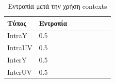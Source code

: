 \begin{table}[h!]
    \begin{center}
        \begin{tabular}{| l | l | l | l | l | l | l | l |}
        \hline
        Τύπος    & Εντροπία \\ \hline
        IntraY   & 0.5      \\ \hline
        IntraUV  & 0.5      \\ \hline
        InterY   & 0.5      \\ \hline
        InterUV  & 0.5      \\ \hline
        \hline
        \end{tabular}
    \end{center}
    \caption{Εντροπία μετά την χρήση contexts}
    \label{table:conentropy}
\end{table} 